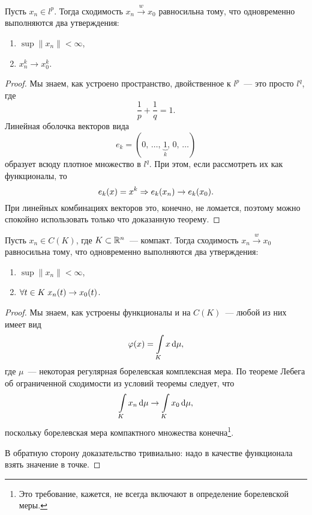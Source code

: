 \documentclass{notes}
\newcommand{\weak}{\xrightarrow{w}}
\begin{document}
	\begin{exm}
		Пусть $x_n \in l^p$. Тогда сходимость $x_n \weak x_0$ равносильна тому, что одновременно выполняются два утверждения:
		\begin{enumerate}
			\item $\sup \|x_n\| < \infty$,
			\item $x_n^k \to x_0^k$.
		\end{enumerate}
		\begin{proof}
			Мы знаем, как устроено пространство, двойственное к $l^p$~--- это просто $l^q$, где 
			\[
				\dfrac{1}{p} + \dfrac{1}{q} = 1.
			\]
			Линейная оболочка векторов вида 
			\[
				e_k = (0, \, \ldots, \, \underbrace{1}_{k}, \, 0, \, \ldots)
			\]
			образует всюду плотное множество в $l^q$. При этом, если рассмотреть их как функционалы, то
			\[
				e_k(x) = x^k \Rightarrow e_k(x_n) \to e_k(x_0).
			\]
			При линейных комбинациях векторов это, конечно, не ломается, поэтому можно спокойно использовать только что доказанную теорему.
		\end{proof}
	\end{exm}

	\begin{exm}
		Пусть $x_n \in C(K)$, где $K \subset \mathbb{R}^n$~--- компакт. Тогда сходимость $x_n \weak x_0$ равносильна тому, что одновременно выполняются два утверждения:
		\begin{enumerate}
			\item $\sup \|x_n\| < \infty$,
			\item $\forall t \in K \; x_n(t) \to x_0(t)$.
		\end{enumerate}
		\begin{proof}
			Мы знаем, как устроены функционалы и на $C(K)$~--- любой из них имеет вид
			\[
				\varphi(x) = \int\limits_K x \, \mathrm{d} \mu,
			\]
			где $\mu$~--- некоторая регулярная борелевская комплексная мера. По теореме Лебега об ограниченной сходимости из условий теоремы следует, что
			\[
				\int\limits_K x_n \, \mathrm{d} \mu \to \int\limits_K x_0 \, \mathrm{d} \mu,
			\]
			поскольку борелевская мера компактного множества конечна\footnote{Это требование, кажется, не всегда включают в определение борелевской меры.}.

			В обратную сторону доказательство тривиально: надо в качестве функционала взять значение в точке.
		\end{proof}
	\end{exm}
\end{document}
